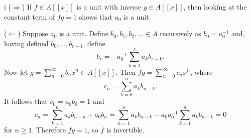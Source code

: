 \begin{partsolution}{1}{5}{i}
(\(\Rightarrow\))
If \(f\in A[[x]]\) is a unit with inverse \(g\in A[[x]]\), then looking at the constant term of \(f g = 1\) shows that \(a_0\) is a unit.

(\(\Leftarrow\))
Suppose \(a_0\) is a unit.
Define \(b_0, b_1, b_2, \ldots \in A\) recursively as \(b_0 = a_0^{-1}\) and, having defined \(b_0,\ldots,b_{r-1}\), define
\begin{equation*}
b_r = -a_0^{-1}\sum_{k=1}^r a_k b_{r-k}.
\end{equation*}
Now let \(g = \sum_{n=0}^\infty b_n x^n \in A[[x]]\).
Then \(f g = \sum_{n=0}^\infty c_n x^n\), where
\begin{equation*}
c_n = \sum_{k=0}^n a_k b_{n-k}.
\end{equation*}
It follows that \(c_0 = a_0 b_0 = 1\) and
\begin{equation*}
c_n
= \sum_{k=1}^n a_k b_{n-k} + a_0 b_n
= \sum_{k=1}^n a_k b_{n-k} - a_0 a_0^{-1} \sum_{k=1}^n a_k b_{n-k}
= 0
\end{equation*}
for \(n \geq 1\).
Therefore \(f g = 1\), so \(f\) is invertible.
\end{partsolution}

